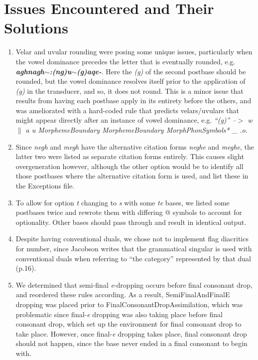 \documentclass{article}
\begin{document}
\begin{tabular}{l l}
\end{tabular}


\section{Issues Encountered and Their Solutions}

\begin{enumerate}

\item Velar and uvular rounding were posing some unique issues, particularly when the vowel dominance precedes the letter that is eventually rounded, e.g. \textit{\textbf{aghnagh$\sim$:(ng)u$\sim$(g)aqe-}}.
%
Here the \textit{(g)} of the second postbase should be rounded, but the vowel dominance resolves itself prior to the application of \textit{(g)} in the transducer, and so, it does not round.
%
This is a minor issue that results from having each postbase apply in its entirety before the others, and was ameliorated with a hard-coded rule that predicts velars/uvulars that might appear directly after an instance of vowel dominance, e.g. \textit{``(g)'' --$>$ w $\|$ a u MorphemeBoundary MorphemeBoundary MorphPhonSymbols* \_ .o.}

\item Since \textit{negh} and \textit{megh} have the alternative citation forms \textit{neghe} and \textit{meghe}, the latter two were listed as separate citation forms entirely.
%
This causes slight overgeneration however, although the other option would be to identify all those postbases where the alternative citation form is used, and list these in the Exceptions file.

\item To allow for option \textit{t} changing to \textit{s} with some \textit{te} bases, we listed some postbases twice and rewrote them with differing @ symbols to account for optionality.
%
Other bases should pass through and result in identical output.

\item Despite having conventional duals, we chose not to implement flag diacritics for number, since Jacobson writes that the grammatical singular is used with conventional duals when referring to “the category” represented by that dual (p.16).

\item We determined that semi-final \textit{e}-dropping occurs before final consonant drop, and reordered these rules according.
%
As a result, SemiFinalAndFinalE dropping was placed prior to FinalConsonantDropAssimilation, which was problematic since final-\textit{e} dropping was also taking place before final consonant drop, which set up the environment for final consonant drop to take place.
%
However, once final-\textit{e} dropping takes place, final consonant drop should not happen, since the base never ended in a final consonant to begin with.


\end{enumerate}
\end{document}
